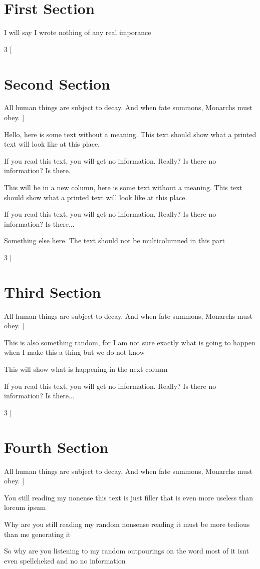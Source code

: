 \documentclass{article}
\begin{document}
\section{First Section}
I will say I wrote nothing of any real imporance 

\begin{multicols}{3}
[
\section{Second Section}
All human things are subject to decay. And when fate summons, Monarchs must obey.
]

Hello, here is some text without a meaning.  This text should show what 
a printed text will look like at this place.

If you read this text, you will get no information.  Really?  Is there 
no information?  Is there.

\columnbreak

This will be in a new column, here is some text without a meaning.  This text 
should show what a printed text will look like at this place.

If you read this text, you will get no information.  Really?  Is there 
no information?  Is there...
\end{multicols}

Something else here. The text should not be multicolumned in this part

\begin{multicols}{3}
[
\section{Third Section}
All human things are subject to decay. And when fate summons, Monarchs must obey.
]

This is also something random, for I am not sure exactly what is going to happen when I make this a thing
but we do not know 

\columnbreak

This will show what is happening in the next column

If you read this text, you will get no information.  Really?  Is there 
no information?  Is there...
\end{multicols}

\begin{multicols}{3}
[
\section{Fourth Section}
All human things are subject to decay. And when fate summons, Monarchs must obey.
]

You still reading my nonense this text is just filler that is even more useless than loreum ipsum 

\columnbreak

Why are you still reading my random nonsense reading it must be more tedious than me generating it 

So why are you listening to my random outpourings on the word most of it isnt even spellcheked and no 
no information
\end{multicols}
\end{document}
